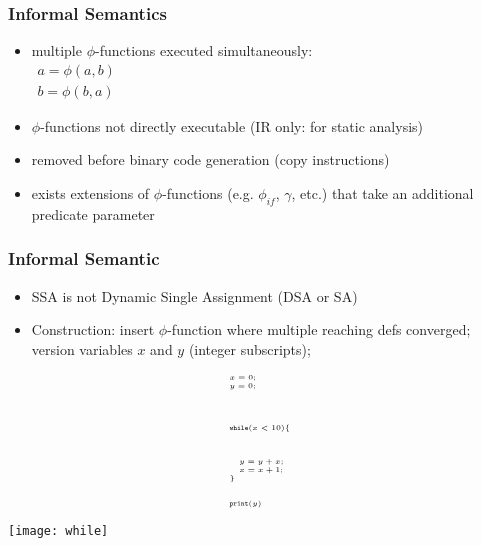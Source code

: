 \begin{frame}
\frametitle{Informal Semantics}
\begin{itemize}
\item multiple $\phi$-functions executed simultaneously:\\ 
$
\begin{array}{l}
  a=\phi(a,b)\\
  b=\phi(b,a)
\end{array}
$
\item $\phi$-functions not directly executable (IR only: for static analysis)
\item removed before binary code generation (copy instructions)
\item exists extensions of $\phi$-functions (e.g. $\phi_{if}$, $\gamma$, etc.) that take an additional predicate parameter
\end{itemize}
\end{frame}

\begin{frame}
\frametitle{Informal Semantic}
\begin{minipage}[b]{\textwidth}
\begin{itemize}
\item SSA is not Dynamic Single Assignment (DSA or SA)
\item Construction: insert $\phi$-function where multiple reaching defs converged; version variables $x$ and $y$ (integer subscripts); 
\end{itemize}
\end{minipage}
\begin{minipage}[t]{0.5\textwidth}
\begin{equation*}\tiny
\begin{array}{l}
x = 0;\\
y = 0;\\
~\\\\\\\\
\texttt{while} (x < 10) \{\\
~\\\\\\
\quad  y = y + x;\\
\quad  x = x + 1;\\
\}\\
~\\\\
\texttt{print}(y)
\end{array} 
\end{equation*}
\end{minipage}
\begin{minipage}[t]{0.4\textwidth}
\strut
\texttt{[image: while]}
\end{minipage}
\end{frame}

